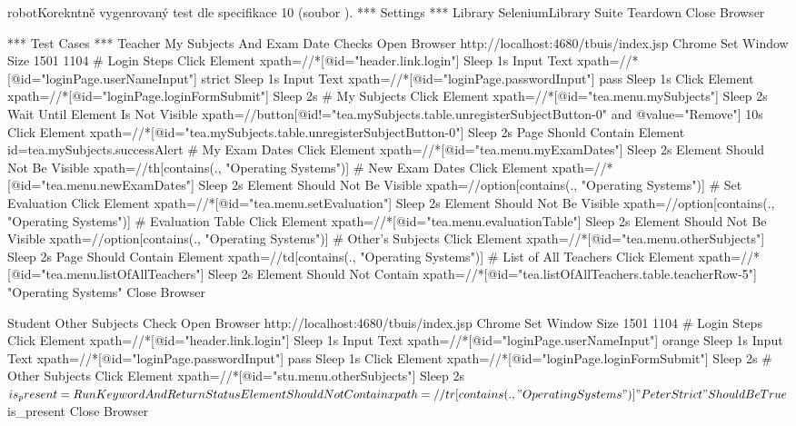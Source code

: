 \documentclass[czech, ma, kiv, he, iso690numb, pdf, viewonly]{fasthesis}
\begin{document}
    \begin{code}{robot}{Korekntně vygenrovaný test dle specifikace 10 (soubor ). \label{lst:gpt4:spec-10-3}}
*** Settings ***
Library           SeleniumLibrary
Suite Teardown    Close Browser

*** Test Cases ***
Teacher My Subjects And Exam Date Checks
    Open Browser    http://localhost:4680/tbuis/index.jsp    Chrome
    Set Window Size    1501    1104
    # Login Steps
    Click Element    xpath=//*[@id="header.link.login"]
    Sleep    1s
    Input Text    xpath=//*[@id="loginPage.userNameInput"]    strict
    Sleep    1s
    Input Text    xpath=//*[@id="loginPage.passwordInput"]    pass
    Sleep    1s
    Click Element    xpath=//*[@id="loginPage.loginFormSubmit"]
    Sleep    2s
    # My Subjects
    Click Element    xpath=//*[@id="tea.menu.mySubjects"]
    Sleep    2s
    Wait Until Element Is Not Visible    xpath=//button[@id!="tea.mySubjects.table.unregisterSubjectButton-0" and @value="Remove"]    10s
    Click Element    xpath=//*[@id="tea.mySubjects.table.unregisterSubjectButton-0"]
    Sleep    2s
    Page Should Contain Element    id=tea.mySubjects.successAlert
    # My Exam Dates
    Click Element    xpath=//*[@id="tea.menu.myExamDates"]
    Sleep    2s
    Element Should Not Be Visible    xpath=//th[contains(., "Operating Systems")]
    # New Exam Dates
    Click Element    xpath=//*[@id="tea.menu.newExamDates"]
    Sleep    2s
    Element Should Not Be Visible    xpath=//option[contains(., "Operating Systems")]
    # Set Evaluation
    Click Element    xpath=//*[@id="tea.menu.setEvaluation"]
    Sleep    2s
    Element Should Not Be Visible    xpath=//option[contains(., "Operating Systems")]
    # Evaluation Table
    Click Element    xpath=//*[@id="tea.menu.evaluationTable"]
    Sleep    2s
    Element Should Not Be Visible    xpath=//option[contains(., "Operating Systems")]
    # Other's Subjects
    Click Element    xpath=//*[@id="tea.menu.otherSubjects"]
    Sleep    2s
    Page Should Contain Element    xpath=//td[contains(., "Operating Systems")]
    # List of All Teachers
    Click Element    xpath=//*[@id="tea.menu.listOfAllTeachers"]
    Sleep    2s
    Element Should Not Contain    xpath=//*[@id="tea.listOfAllTeachers.table.teacherRow-5"]    "Operating Systems"
    Close Browser

Student Other Subjects Check
    Open Browser    http://localhost:4680/tbuis/index.jsp    Chrome
    Set Window Size    1501    1104
    # Login Steps
    Click Element    xpath=//*[@id="header.link.login"]
    Sleep    1s
    Input Text    xpath=//*[@id="loginPage.userNameInput"]    orange
    Sleep    1s
    Input Text    xpath=//*[@id="loginPage.passwordInput"]    pass
    Sleep    1s
    Click Element    xpath=//*[@id="loginPage.loginFormSubmit"]
    Sleep    2s
    # Other Subjects
    Click Element    xpath=//*[@id="stu.menu.otherSubjects"]
    Sleep    2s
    ${is_present}=    Run Keyword And Return Status    Element Should Not Contain    xpath=//tr[contains(., "Operating Systems")]    "Peter Strict"
    Should Be True    ${is_present}
    Close Browser\end{code}
\end{document}

